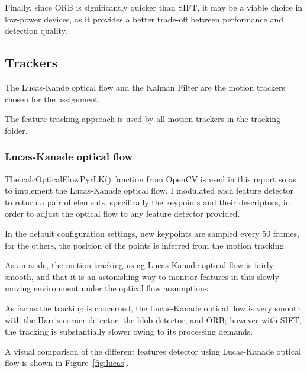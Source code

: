 \documentclass[journal]{IEEEtran}
\begin{document}
Finally, since ORB is significantly quicker than SIFT, it may be a viable choice in low-power devices, as it provides a better trade-off between performance and detection quality. 

\subsection{Trackers}

The Lucas-Kande optical flow and the Kalman Filter are the motion trackers chosen for the assignment.

The feature tracking approach is used by all motion trackers in the tracking folder.

\subsubsection{Lucas-Kanade optical flow}

The calcOpticalFlowPyrLK() function from OpenCV is used in this report so as to implement the Lucas-Kanade optical flow.
I modulated each feature detector to return a pair of elements, specifically the keypoints and their descriptors, in order to adjust the optical flow to any feature detector provided. 

In the default configuration settings, new keypoints are sampled every 50 frames, for the others, the position of the points is inferred from the motion tracking.

As an aside, the motion tracking using Lucas-Kanade optical flow is fairly smooth, and that it is an astonishing way to monitor features in this slowly moving environment under the optical flow assumptions. 

As far as the tracking is concerned, the Lucas-Kanade optical flow is very smooth with the Harris corner detector, the blob detector, and ORB; however with SIFT, the tracking is substantially slower owing to its processing demands. 

A visual comparison of the different features detector using Lucas-Kanade optical flow is shown in Figure~\ref{fig:lucas}.
\end{document}
